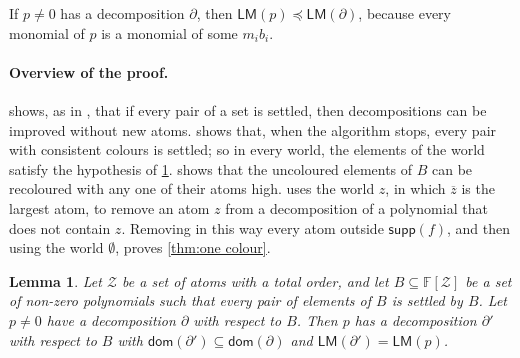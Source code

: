 \documentclass[12pt,a4paper,article]{memoir}
\newcommand{\F}{\mathbb{F}}
\newcommand{\poly}[2]{#1[#2]}
\newcommand{\supp}{\mathsf{supp}}
\newcommand{\LM}{\mathsf{LM}}
\newcommand{\hi}[1]{\overline{#1}}
\newtheorem{lemma}[theorem]{Lemma}
\theoremstyle{definition}
\begin{document}
If $p \neq 0$ has a decomposition $\partial$, then $\LM(p) \preceq \LM(\partial)$,
because every monomial of $p$ is a monomial of some $m_i b_i$.

\paragraph{Overview of the proof.}
 shows, as in \cite[Lemma 24]{GL25},
that if every pair of a set is settled, then decompositions can be improved without new atoms.
 shows that, when the algorithm stops, every pair with consistent colours is settled;
so in every world, the elements of the world satisfy the hypothesis of \cref{lem:weak basis}.
 shows that the uncoloured elements of $B$ can be recoloured with any one of their atoms high.
 uses the world $z$, in which $\hi{z}$ is the largest atom,
to remove an atom $z$ from a decomposition of a polynomial that does not contain $z$.
Removing in this way every atom outside $\supp(f)$,
and then using the world $\emptyset$, proves \cref{thm:one colour}.

\begin{lemma}\label{lem:weak basis}
Let $\mathcal{Z}$ be a set of atoms with a total order,
and let $B \subseteq \poly{\F}{\mathcal{Z}}$ be a set of non-zero polynomials such that every pair of elements of $B$ is settled by $B$.
Let $p \neq 0$ have a decomposition $\partial$ with respect to $B$.
Then $p$ has a decomposition $\partial'$ with respect to $B$
with $\mathsf{dom}(\partial') \subseteq \mathsf{dom}(\partial)$ and $\LM(\partial') = \LM(p)$.
\end{lemma}
\end{document}
